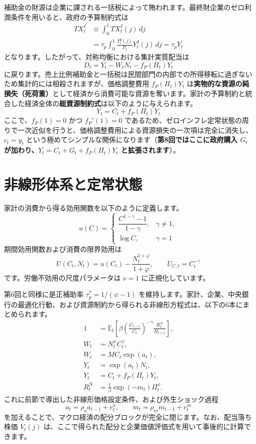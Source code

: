\documentclass[
  japanese,
  lualatex,
  ja=standard,
  12pt,
  a4paper]{ltjsarticle}
\begin{document}
補助金の財源は企業に課される一括税によって賄われます。最終財企業のゼロ利潤条件を用いると、政府の予算制約式は
\[
\begin{aligned}
TX_t^I
&\equiv\int_0^1TX_t^I(j)\,dj\\
&=\tau_p\int_0^1
\frac{P_t^I(j)}{P_t}Y_t^I(j)\,dj
=\tau_pY_t
\end{aligned}
\] となります。したがって、対称均衡における集計実質配当は \[
D_t
=Y_t-W_tN_t-f_P(\Pi_t)Y_t
\]
に戻ります。売上比例補助金と一括税は民間部門の内部での所得移転に過ぎないため集計的には相殺されますが、価格調整費用
\(f_P(\Pi_t)Y_t\)
は\textbf{実物的な資源の純損失（死荷重）}として経済から消費可能な資源を奪います。家計の予算制約と統合した経済全体の\textbf{総資源制約式}は以下のように与えられます。
\[
Y_t=C_t+f_P(\Pi_t)Y_t
\] ここで、\(f_P(1)=0\) かつ \(f_P'(1)=0\)
であるため、ゼロインフレ定常状態の周りで一次近似を行うと、価格調整費用による資源損失の一次項は完全に消失し、\(c_t=y_t\)
という極めてシンプルな関係になります（\textbf{第8回ではここに政府購入
\(G_t\) が加わり、\(Y_t=C_t+G_t+f_P(\Pi_t)Y_t\) と拡張されます}）。

\section{非線形体系と定常状態}\label{ux975eux7ddaux5f62ux4f53ux7cfbux3068ux5b9aux5e38ux72b6ux614b}

家計の消費から得る効用関数を以下のように定義します。 \[
u(C)=
\begin{cases}
\dfrac{C^{1-\gamma}-1}{1-\gamma},&\gamma\neq1,\\[6pt]
\log C,&\gamma=1
\end{cases}
\] 期間効用関数および消費の限界効用は \[
U(C_t,N_t)=u(C_t)-\frac{N_t^{1+\varphi}}{1+\varphi},
\qquad
U_{C,t}=C_t^{-\gamma}
\] です。労働不効用の尺度パラメータは \(\nu=1\) に正規化しています。

第6回と同様に是正補助率 \(\tau_p^*=1/(\psi-1)\)
を維持します。家計、企業、中央銀行の最適化行動、および資源制約から得られる非線形方程式は、以下の6本にまとめられます。
\[
\begin{aligned}
1&=\mathbb{E}_t\left[
\beta\left(\frac{C_{t+1}}{C_t}\right)^{-\gamma}
\frac{R_t^N}{\Pi_{t+1}}
\right],\\
W_t&=N_t^\varphi C_t^\gamma,\\
W_t&=MC_t\exp(a_t),\\
Y_t&=\exp(a_t)N_t,\\
Y_t&=C_t+f_P(\Pi_t)Y_t,\\
R_t^N&=\frac{1}{\beta}\exp(-m_t)\Pi_t^\phi.
\end{aligned}
\] これに前節で導出した非線形価格設定条件、および外生ショック過程 \[
a_t=\rho_a a_{t-1}+e_t^a,
\qquad
m_t=\rho_m m_{t-1}+e_t^m
\]
を加えることで、マクロ経済の配分ブロックが完全に閉じます。なお、配当落ち株価
\(V_t(j)\)
は、ここで得られた配分と企業価値評価式を用いて事後的に計算できます。
\end{document}
